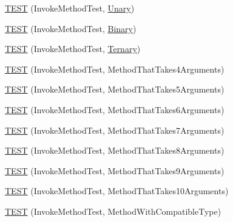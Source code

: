 \begin{DoxyCompactItemize}
\item 
\mbox{\hyperlink{namespacetesting_1_1gmock__more__actions__test_a386ce48f1f0a49e2b94a16deeffc2084}{T\+E\+ST}} (Invoke\+Method\+Test, \mbox{\hyperlink{namespacetesting_1_1gmock__more__actions__test_aad456ea2ee1b0cb2741b676a34f540a3}{Unary}})
\item 
\mbox{\hyperlink{namespacetesting_1_1gmock__more__actions__test_a86221fa7d09853358e38c01b0d6ceced}{T\+E\+ST}} (Invoke\+Method\+Test, \mbox{\hyperlink{namespacetesting_1_1gmock__more__actions__test_ad772cefe4443030c4b50e0d497d0edbb}{Binary}})
\item 
\mbox{\hyperlink{namespacetesting_1_1gmock__more__actions__test_a2b98a8a68d37a0bec600227372a1cff8}{T\+E\+ST}} (Invoke\+Method\+Test, \mbox{\hyperlink{namespacetesting_1_1gmock__more__actions__test_ab98b352528a0b72625b4710a6fc648a1}{Ternary}})
\item 
\mbox{\hyperlink{namespacetesting_1_1gmock__more__actions__test_af0ab6ef9fdf48e8442a5579ab27eb517}{T\+E\+ST}} (Invoke\+Method\+Test, Method\+That\+Takes4\+Arguments)
\item 
\mbox{\hyperlink{namespacetesting_1_1gmock__more__actions__test_a512db122c5beadeeef026bb54aec7e45}{T\+E\+ST}} (Invoke\+Method\+Test, Method\+That\+Takes5\+Arguments)
\item 
\mbox{\hyperlink{namespacetesting_1_1gmock__more__actions__test_a715c088109e141aa577e497e3729b98b}{T\+E\+ST}} (Invoke\+Method\+Test, Method\+That\+Takes6\+Arguments)
\item 
\mbox{\hyperlink{namespacetesting_1_1gmock__more__actions__test_a1f11171c55d049143c980502213e0b11}{T\+E\+ST}} (Invoke\+Method\+Test, Method\+That\+Takes7\+Arguments)
\item 
\mbox{\hyperlink{namespacetesting_1_1gmock__more__actions__test_a5bfedd2255bbfe7ffcbc76ec581b2ff6}{T\+E\+ST}} (Invoke\+Method\+Test, Method\+That\+Takes8\+Arguments)
\item 
\mbox{\hyperlink{namespacetesting_1_1gmock__more__actions__test_acdcc7f6a35e6373f3d0b3a71f98c418b}{T\+E\+ST}} (Invoke\+Method\+Test, Method\+That\+Takes9\+Arguments)
\item 
\mbox{\hyperlink{namespacetesting_1_1gmock__more__actions__test_a14b55eb4c0d0b3149e269eea1443cb58}{T\+E\+ST}} (Invoke\+Method\+Test, Method\+That\+Takes10\+Arguments)
\item 
\mbox{\hyperlink{namespacetesting_1_1gmock__more__actions__test_adb0c29d688c079ad5bf07d5a0bd72aea}{T\+E\+ST}} (Invoke\+Method\+Test, Method\+With\+Compatible\+Type)
\item 

\end{DoxyCompactItemize}
